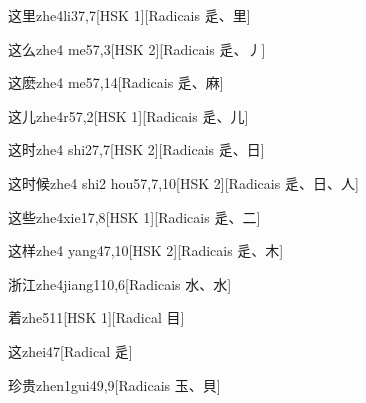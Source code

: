 \begin{entry}{这里}{zhe4li3}{7,7}[HSK 1][Radicais ⾡、⾥]
\end{entry}

\begin{entry}{这么}{zhe4 me5}{7,3}[HSK 2][Radicais ⾡、⼃]
\end{entry}

\begin{entry}{这麽}{zhe4 me5}{7,14}[Radicais ⾡、⿇]
\end{entry}

\begin{entry}{这儿}{zhe4r5}{7,2}[HSK 1][Radicais ⾡、⼉]
\end{entry}

\begin{entry}{这时}{zhe4 shi2}{7,7}[HSK 2][Radicais ⾡、⽇]
\end{entry}

\begin{entry}{这时候}{zhe4 shi2 hou5}{7,7,10}[HSK 2][Radicais ⾡、⽇、⼈]
\end{entry}

\begin{entry}{这些}{zhe4xie1}{7,8}[HSK 1][Radicais ⾡、⼆]
\end{entry}

\begin{entry}{这样}{zhe4 yang4}{7,10}[HSK 2][Radicais ⾡、⽊]
\end{entry}

\begin{entry}{浙江}{zhe4jiang1}{10,6}[Radicais ⽔、⽔]
\end{entry}

\begin{entry}{着}{zhe5}{11}[HSK 1][Radical ⽬]
\end{entry}

\begin{entry}{这}{zhei4}{7}[Radical ⾡]
\end{entry}

\begin{entry}{珍贵}{zhen1gui4}{9,9}[Radicais ⽟、⾙]
\end{entry}


